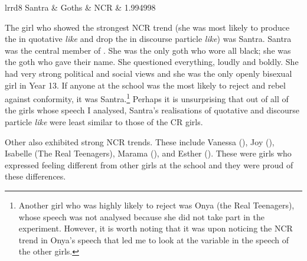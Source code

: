 \begin{table}[htbp]
\begin{center}
\begin{tabular}{lrrd{8}}
Santra	& Goths     & NCR    & 1.994998\\
   \lspbottomrule
\end{tabular}
\caption{Likelihood of an individual producing  in discourse particle \textit{like} compared to quotative \textit{like}. Estimates are based on a separate model fit to the production data modelling the likelihood of  realisation, with an interaction between the random effect of a speaker and whether the token was the quotative or the discourse particle. The presented estimate for each speaker is the difference between random coefficients when the token is a discourse particle and when it is a quotative.}
\label{tab:indiv}
\end{center}
\end{table}


The girl who showed the strongest NCR trend (she was most likely to produce the  in quotative \textit{like} and drop the  in discourse particle \textit{like}) was Santra. Santra was the central member of . She was the only goth who wore all black; she was the goth who gave  their name. She questioned everything, loudly and boldly. She had very strong political and social views and she was the only openly bisexual girl in Year 13. If anyone at the school was the most likely to reject  and rebel against conformity, it was Santra.\footnote{Another girl who was highly likely to reject  was Onya (the Real Teenagers), whose speech was not analysed because she did not take part in the  experiment. However, it is worth noting that it was upon noticing the NCR trend in Onya's speech that led me to look at the variable in the speech of the other girls.} Perhaps it is unsurprising that out of all of the girls whose speech I analysed, Santra's realisations of quotative and discourse particle \textit{like} were least similar to those of the CR girls.

Other  also exhibited strong NCR trends. These include Va\-nessa (), Joy (), Isa\-belle (The Real Teen\-agers), Ma\-rama (), and Esther (). These were girls who expressed feeling different from other girls at the school and they were proud of these differences. 

